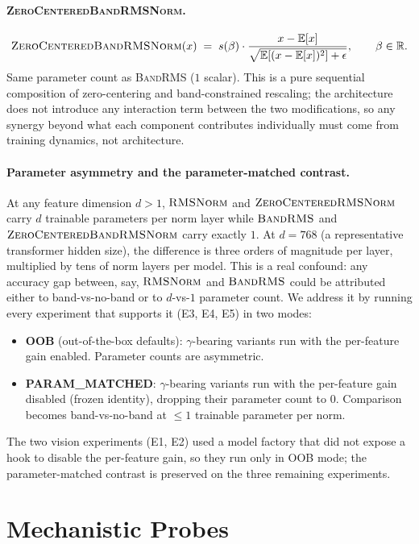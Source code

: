 \documentclass{article}
\newcommand{\R}{\mathbb{R}}
\newcommand{\E}{\mathbb{E}}
\newcommand{\rms}{\textsc{RMSNorm}}
\newcommand{\bandrms}{\textsc{BandRMS}}
\newcommand{\zcrms}{\textsc{ZeroCentered}\-\textsc{RMSNorm}}
\newcommand{\zcband}{\textsc{ZeroCentered}\-\textsc{BandRMSNorm}}
\begin{document}
\paragraph{\zcband{}.}
\begin{equation}
  \zcband(x) \;=\; s(\beta) \cdot \frac{x - \E[x]}{\sqrt{\E[(x - \E[x])^2] + \epsilon}},
  \qquad \beta \in \R.
  \label{eq:zcband}
\end{equation}
Same parameter count as \bandrms{} ($1$ scalar).
This is a pure sequential composition of zero-centering and band-constrained rescaling; the architecture does not introduce any interaction term between the two modifications, so any synergy beyond what each component contributes individually must come from training dynamics, not architecture.

\paragraph{Parameter asymmetry and the parameter-matched contrast.}
At any feature dimension $d > 1$, $\rms{}$ and $\zcrms{}$ carry $d$ trainable parameters per norm layer while $\bandrms{}$ and $\zcband{}$ carry exactly $1$.
At $d = 768$ (a representative transformer hidden size), the difference is three orders of magnitude per layer, multiplied by tens of norm layers per model.
This is a real confound: any accuracy gap between, say, $\rms{}$ and $\bandrms{}$ could be attributed either to band-vs-no-band or to $d$-vs-$1$ parameter count.
We address it by running every experiment that supports it (E3, E4, E5) in two modes:
\begin{itemize}
  \item \textbf{OOB} (out-of-the-box defaults): $\gamma$-bearing variants run with the per-feature gain enabled. Parameter counts are asymmetric.
  \item \textbf{PARAM\_MATCHED}: $\gamma$-bearing variants run with the per-feature gain disabled (frozen identity), dropping their parameter count to $0$. Comparison becomes band-vs-no-band at $\leq 1$ trainable parameter per norm.
\end{itemize}
The two vision experiments (E1, E2) used a model factory that did not expose a hook to disable the per-feature gain, so they run only in OOB mode; the parameter-matched contrast is preserved on the three remaining experiments.

\section{Mechanistic Probes}
\label{sec:probes}
\end{document}
